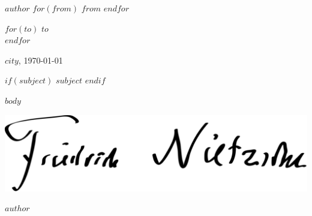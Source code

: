 \documentclass[$fontsize$, a4paper]{article}
\begin{document}
\small
\textsc{\textbf{$author$}}
$for(from)$
\textbullet{} \textsc{$from$}
$endfor$

\vspace{1em}

\normalsize \sffamily
$for(to)$
$to$\\
$endfor$

\vspace{3em}

\rmfamily
\begin{flushright}
  $city$, \today
\end{flushright}

\vspace{1em}

$if(subject)$
\textbf{$subject$}
$endif$

\vspace{1em}

$body$

{
    \begin{FlushRight}
      \includegraphics[height=5.5\baselineskip]{signature.pdf} \par
      $author$
    \end{FlushRight}
}
\end{document}

